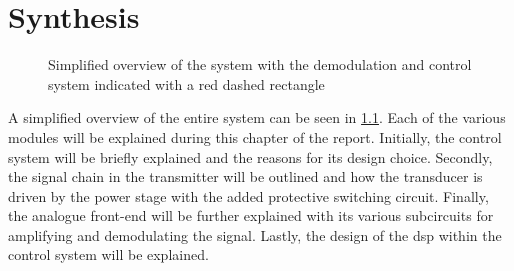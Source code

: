 \chapter{Synthesis} \label{cha:synthesis} %

\begin{figure}[ht]
	\centering
	\resizebox{\textwidth}{!}{
		
	}
	\caption[Simplified overview of the system]{Simplified overview of the system with the demodulation and control system indicated with a red dashed rectangle}
	\label{fig:1_system_overview}
\end{figure}
A simplified overview of the entire system can be seen in \cref{fig:1_system_overview}. Each of the various modules will be explained during this chapter of the report. Initially, the control system will be briefly explained and the reasons for its design choice. Secondly, the signal chain in the transmitter will be outlined and how the transducer is driven by the power stage with the added protective switching circuit. Finally, the analogue front-end will be further explained with its various subcircuits for amplifying and demodulating the signal. Lastly, the design of the \gls{dsp} within the control system will be explained.

